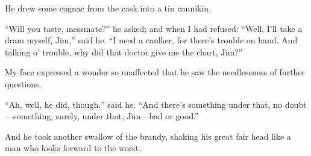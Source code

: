 He drew some cognac from the cask into a tin cannikin.

\enquote{Will you taste, messmate?} he asked; and when I had refused: \enquote{Well, I’ll take a dram myself, Jim,} said he. \enquote{I need a caulker, for there’s trouble on hand. And talking o’ trouble, why did that doctor give me the chart, Jim?}

My face expressed a wonder so unaffected that he saw the needlessness of further questions.

\enquote{Ah, well, he did, though,} said he. \enquote{And there’s something under that, no doubt---something, surely, under that, Jim---bad or good.}

And he took another swallow of the brandy, shaking his great fair head like a man who looks forward to the worst.